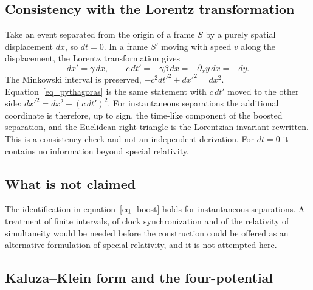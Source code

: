 \documentclass[pdflatex,sn-mathphys-num]{sn-jnl}%
\theoremstyle{thmstyleone}%
\theoremstyle{thmstyletwo}%
\theoremstyle{thmstylethree}%
\begin{document}
\subsection{Consistency with the Lorentz transformation}

Take an event separated from the origin of a frame $S$ by a purely spatial displacement $dx$, so $dt=0$. In a frame $S'$ moving with speed $v$ along the displacement, the Lorentz transformation gives
\begin{equation}\label{eq_boost}
    dx'=\gamma\,dx,\qquad c\,dt'=-\gamma\beta\,dx=-\partial_xy\,dx=-dy .
\end{equation}
The Minkowski interval is preserved, $-c^2dt'^2+dx'^2=dx^2$. Equation~\eqref{eq_pythagoras} is the same statement with $c\,dt'$ moved to the other side: $dx'^2=dx^2+\left(c\,dt'\right)^2$. For instantaneous separations the additional coordinate is therefore, up to sign, the time-like component of the boosted separation, and the Euclidean right triangle is the Lorentzian invariant rewritten. This is a consistency check and not an independent derivation. For $dt=0$ it contains no information beyond special relativity.

\subsection{What is not claimed}

The identification in equation~\eqref{eq_boost} holds for instantaneous separations. A treatment of finite intervals, of clock synchronization and of the relativity of simultaneity would be needed before the construction could be offered as an alternative formulation of special relativity, and it is not attempted here.

\subsection{Kaluza--Klein form and the four-potential}\label{sec_kk}
\end{document}
